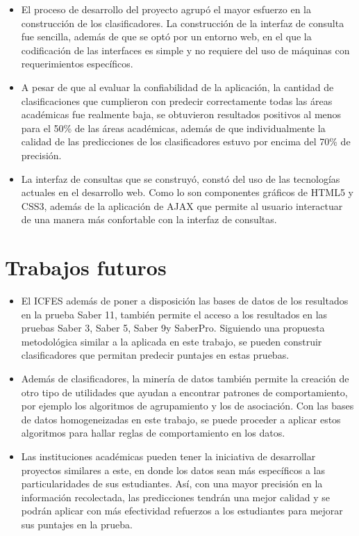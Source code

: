 \begin{itemize}
\item El proceso de desarrollo del proyecto agrupó el mayor esfuerzo en la construcción de los clasificadores. La construcción de la interfaz de consulta fue sencilla, además de que se optó por un entorno web, en el que la codificación de las interfaces es simple y no requiere del uso de máquinas con requerimientos específicos.

\item A pesar de que al evaluar la confiabilidad de la aplicación, la cantidad de clasificaciones que cumplieron con predecir correctamente todas las áreas académicas fue realmente baja, se obtuvieron resultados positivos al menos para el 50\% de las áreas académicas, además de que individualmente la calidad de las predicciones de los clasificadores estuvo por encima del 70\% de precisión.

\item La interfaz de consultas que se construyó, constó del uso de las tecnologías actuales en el desarrollo web. Como lo son componentes gráficos de HTML5 y CSS3, además de la aplicación de AJAX que permite al usuario interactuar de una manera más confortable con la interfaz de consultas.
\end{itemize}
\section{Trabajos futuros}
\begin{itemize}
\item El ICFES además de poner a disposición las bases de datos de los resultados en la prueba Saber 11\degree, también permite el acceso a los resultados en las pruebas Saber 3\degree, Saber 5\degree, Saber 9\degree y SaberPro. Siguiendo una propuesta metodológica similar a la aplicada en este trabajo, se pueden construir clasificadores que permitan predecir puntajes en estas pruebas.

\item Además de clasificadores, la minería de datos también permite la creación de otro tipo de utilidades que ayudan a encontrar patrones de comportamiento, por ejemplo los algoritmos de agrupamiento y los de asociación. Con las bases de datos homogeneizadas en este trabajo, se puede proceder a aplicar estos algoritmos para hallar reglas de comportamiento en los datos.

\item Las instituciones académicas pueden tener la iniciativa de desarrollar proyectos similares a este, en donde los datos sean más específicos a las particularidades de sus estudiantes. Así, con una mayor precisión en la información recolectada, las predicciones tendrán una mejor  calidad y se podrán aplicar con más efectividad refuerzos a los estudiantes para mejorar sus puntajes en la prueba.
\end{itemize}